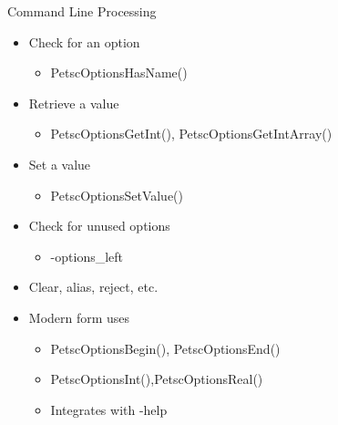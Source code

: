 \begin{frame}{Command Line Processing}

\begin{itemize}
  \item Check for an option
  \begin{itemize}
    \item {\kb PetscOptionsHasName()}
  \end{itemize}

  \item Retrieve a value
  \begin{itemize}
    \item {\kb PetscOptionsGetInt()}, {\kb PetscOptionsGetIntArray()}
  \end{itemize}

  \item Set a value
  \begin{itemize}
    \item {\kb PetscOptionsSetValue()}
  \end{itemize}

  \item Check for unused options
  \begin{itemize}
    \item {\kb -options\_left}
  \end{itemize}

  \item Clear, alias, reject, etc.

  \item Modern form uses
  \begin{itemize}
    \item {\kb PetscOptionsBegin()}, {\kb PetscOptionsEnd()}

    \item {\kb PetscOptionsInt()},{\kb PetscOptionsReal()}

    \item Integrates with {\kb -help}
  \end{itemize}
\end{itemize}

\end{frame}
